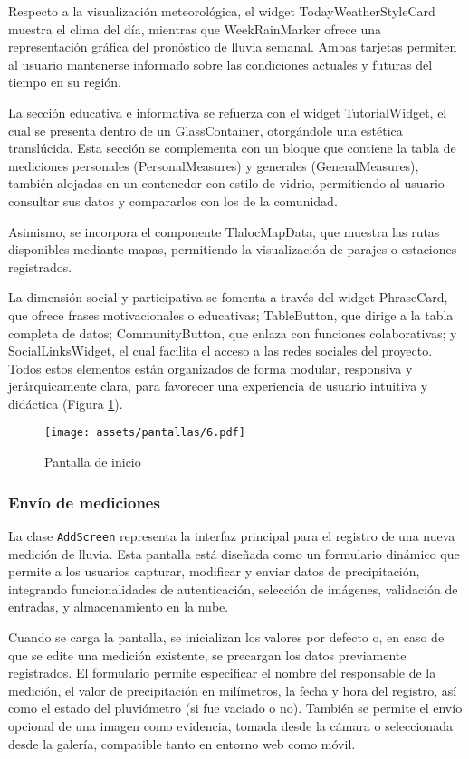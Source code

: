 Respecto a la visualización meteorológica, el widget TodayWeatherStyleCard muestra el clima del día, mientras que WeekRainMarker ofrece una representación gráfica del pronóstico de lluvia semanal. Ambas tarjetas permiten al usuario mantenerse informado sobre las condiciones actuales y futuras del tiempo en su región.

La sección educativa e informativa se refuerza con el widget TutorialWidget, el cual se presenta dentro de un GlassContainer, otorgándole una estética translúcida. Esta sección se complementa con un bloque que contiene la tabla de mediciones personales (PersonalMeasures) y generales (GeneralMeasures), también alojadas en un contenedor con estilo de vidrio, permitiendo al usuario consultar sus datos y compararlos con los de la comunidad.

Asimismo, se incorpora el componente TlalocMapData, que muestra las rutas disponibles mediante mapas, permitiendo la visualización de parajes o estaciones registrados. 

La dimensión social y participativa se fomenta a través del widget PhraseCard, que ofrece frases motivacionales o educativas; TableButton, que dirige a la tabla completa de datos;  CommunityButton, que enlaza con funciones colaborativas;  y SocialLinksWidget, el cual facilita el acceso a las redes sociales del proyecto. Todos estos elementos están organizados de forma modular, responsiva y jerárquicamente clara, para favorecer una experiencia de usuario intuitiva y didáctica (Figura \ref{pantallas6}).
\begin{figure}[h!]
\centering
  \texttt{[image: assets/pantallas/6.pdf]}
  \caption{Pantalla de inicio}
  \label{pantallas6}
\end{figure}

  

\newpage
\subsubsection*{Envío de mediciones}


La clase \texttt{AddScreen} %
representa la interfaz principal para el registro de una nueva medición de lluvia. Esta pantalla está diseñada como un formulario dinámico que permite a los usuarios capturar, modificar y enviar datos de precipitación, integrando funcionalidades de autenticación, selección de imágenes, validación de entradas, y almacenamiento en la nube.

Cuando se carga la pantalla, se inicializan los valores por defecto o, en caso de que se edite una medición existente, se precargan los datos previamente registrados. El formulario permite especificar el nombre del responsable de la medición, el valor de precipitación en milímetros, la fecha y hora del registro, así como el estado del pluviómetro (si fue vaciado o no). También se permite el envío opcional de una imagen como evidencia, tomada desde la cámara o seleccionada desde la galería, compatible tanto en entorno web como móvil.

